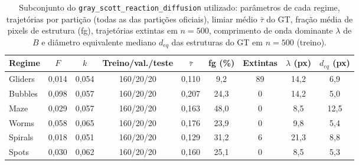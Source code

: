 \begin{table}[htbp]
\centering
\caption{Subconjunto do \texttt{gray\_scott\_reaction\_diffusion} utilizado: parâmetros de cada regime, trajetórias por partição (todas as das partições oficiais), limiar médio $\bar\tau$ do GT, fração média de pixels de estrutura (fg), trajetórias extintas em $n=500$, comprimento de onda dominante $\lambda$ de $B$ e diâmetro equivalente mediano $d_{eq}$ das estruturas do GT em $n=500$ (treino).}
\label{tab:dados}
\footnotesize\setlength{\tabcolsep}{3pt}
\begin{sbcfitwidth}
\begin{tabular}{lcccccccc}
\toprule
Regime & $F$ & $k$ & Treino/val./teste & $\bar\tau$ & fg (\%) & Extintas & $\lambda$ (px) & $d_{eq}$ (px) \\
\midrule
Gliders & 0{,}014 & 0{,}054 & 160/20/20 & 0{,}110 & 9{,}2 & 89 & 14{,}2 & 6{,}9 \\
Bubbles & 0{,}098 & 0{,}057 & 160/20/20 & 0{,}207 & 24{,}3 & 0 & 14{,}2 & 5{,}0 \\
Maze & 0{,}029 & 0{,}057 & 160/20/20 & 0{,}163 & 48{,}0 & 0 & 8{,}5 & 12{,}5 \\
Worms & 0{,}058 & 0{,}065 & 160/20/20 & 0{,}176 & 23{,}9 & 0 & 9{,}8 & 5{,}4 \\
Spirals & 0{,}018 & 0{,}051 & 160/20/20 & 0{,}129 & 31{,}2 & 6 & 21{,}3 & 8{,}8 \\
Spots & 0{,}030 & 0{,}062 & 160/20/20 & 0{,}160 & 25{,}1 & 0 & 8{,}5 & 5{,}3 \\
\bottomrule
\end{tabular}
\end{sbcfitwidth}
\end{table}
